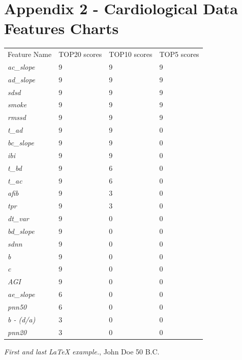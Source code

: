 \documentclass{article}
\begin{document}
\section*{Appendix 2 - Cardiological Data Features Charts} \label{sec:app2}
\begin{table}[h]
\begin{tabular}{llll}
Feature Name       & TOP20 scores  & TOP10 scores  & TOP5 scores \\
\textit{ac\_slope} & 9             & 9             & 9            \\
\textit{ad\_slope} & 9             & 9             & 9            \\
\textit{sdsd}      & 9             & 9             & 9            \\
\textit{smoke}     & 9             & 9             & 9            \\
\textit{rmssd}     & 9             & 9             & 9            \\
\textit{t\_ad}     & 9             & 9             & 0            \\
\textit{bc\_slope} & 9             & 9             & 0            \\
\textit{ibi}       & 9             & 9             & 0            \\
\textit{t\_bd}     & 9             & 6             & 0            \\
\textit{t\_ac}     & 9             & 6             & 0            \\
\textit{afib}      & 9             & 3             & 0            \\
\textit{tpr}       & 9             & 3             & 0            \\
\textit{dt\_var}   & 9             & 0             & 0            \\
\textit{bd\_slope} & 9             & 0             & 0            \\
\textit{sdnn}      & 9             & 0             & 0            \\
\textit{b}         & 9             & 0             & 0            \\
\textit{c}         & 9             & 0             & 0            \\
\textit{AGI}       & 9             & 0             & 0            \\
\textit{ae\_slope} & 6             & 0             & 0            \\
\textit{pnn50}     & 6             & 0             & 0            \\
\textit{b - (d/a)} & 3             & 0             & 0            \\
\textit{pnn20}     & 3             & 0             & 0
\end{tabular}
\end{table}


\begin{thebibliography}{9}
 \emph{First and last \LaTeX{} example.},
John Doe 50 B.C.
\end{thebibliography}
\end{document}
